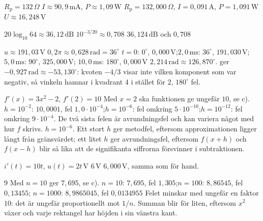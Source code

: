 
\begin{facit}

  $R_{\text{p}} = 132\,\Omega$
 $I \approx 90{,}9\,\text{mA}$, $P \approx 1{,}09\,\text{W}$
 $R_{\text{p}} = 132{,}000\,\Omega$, $I = 0{,}091\,\text{A}$, $P = 1{,}091\,\text{W}$
 $U \approx 16{,}248\,\text{V}$

  $20\log_{10} 64 \approx 36{,}12\,\text{dB}$  $10^{-3/20} \approx 0{,}708$
 $36{,}124\,\text{dB}$ och $0{,}708$

  $u \approx 191{,}03\,\text{V}$
 $0{,}2\pi \approx 0{,}628\,\text{rad} = 36^{\circ}$
 $t = 0$: $0^{\circ}$, $0{,}000\,\text{V}$;\enspace $2{,}0\,\text{ms}$: $36^{\circ}$,
$191{,}030\,\text{V}$;\enspace $5{,}0\,\text{ms}$: $90^{\circ}$, $325{,}000\,\text{V}$;\enspace
$10{,}0\,\text{ms}$: $180^{\circ}$, $0{,}000\,\text{V}$
 $2{,}214\,\text{rad} \approx 126{,}870^{\circ}$.  ger
$-0{,}927\,\text{rad} \approx -53{,}130^{\circ}$: kvoten $-4/3$ visar inte vilken komponent som
var negativ, så vinkeln hamnar i kvadrant 4 i stället för 2, $180^{\circ}$ fel.

  $f'(x) = 3x^2 - 2$, $f'(2) = 10$
 Med $x = 2$ ska funktionen ge ungefär $10$, se c).
 $h = 10^{-2}$: $10{,}0001$, fel $1{,}0 \cdot 10^{-4}$;\enspace $h = 10^{-6}$: fel omkring
$5 \cdot 10^{-10}$;\enspace $h = 10^{-12}$: fel omkring $9 \cdot 10^{-4}$. De två sista felen är
avrundningsfel och kan variera något med hur $f$ skrivs.
 $h = 10^{-6}$. Ett stort $h$ ger metodfel, eftersom approximationen ligger långt från
gränsvärdet; ett litet $h$ ger avrundningsfel, eftersom $f(x + h)$ och $f(x - h)$ blir så lika
att de signifikanta siffrorna försvinner i subtraktionen.

  $i'(t) = 10t$, $u(t) = 2t\,\text{V}$  $6\,\text{V}$
 $6{,}000\,\text{V}$, samma som för hand.

  $9$  Med $n = 10$ ger  $7{,}695$, se c).
 $n = 10$: $7{,}695$, fel $1{,}305$;\enspace $n = 100$: $8{,}86545$, fel $0{,}13455$;\enspace
$n = 1000$: $8{,}9865045$, fel $0{,}0134955$
 Felet minskar med ungefär en faktor $10$: det är ungefär proportionellt mot $1/n$. Summan
blir för liten, eftersom $x^2$ växer och varje rektangel har höjden i sin vänstra kant.


\end{facit}
